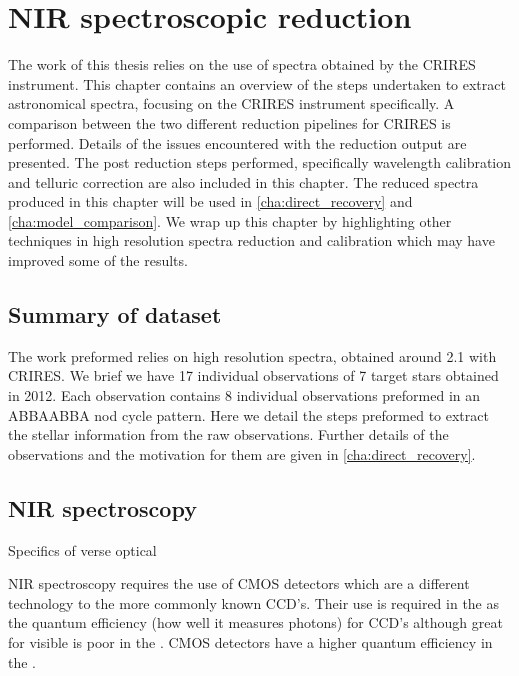 
\chapter{NIR spectroscopic reduction} %
\label{cha:reduction}
The work of this thesis relies on the use of \nir{} spectra obtained by the CRIRES instrument. This chapter contains an overview of the steps undertaken to extract astronomical spectra, focusing on the CRIRES instrument specifically. A comparison between the two different reduction pipelines for CRIRES is performed. Details of the issues encountered with the reduction output are presented. The post reduction steps performed, specifically wavelength calibration and telluric correction are also included in this chapter. The reduced spectra produced in this chapter will be used in \cref{cha:direct_recovery} and \cref{cha:model_comparison}. We wrap up this chapter by highlighting other techniques in high resolution \nir{} spectra reduction and calibration which may have improved some of the results.

\section{Summary of dataset}
\todo{}{}
The work preformed relies on high resolution \nir{} spectra, obtained around 2.1\um{} with CRIRES. We brief we have 17 individual observations of 7 target stars obtained in 2012. Each observation contains 8 individual observations preformed in an ABBAABBA nod cycle pattern. Here we detail the steps preformed to extract the stellar information from the raw observations. Further details of the observations and the motivation for them are given in \cref{cha:direct_recovery}.


\section{NIR spectroscopy}
\todo{}{}
Specifics of \nir{} verse optical

NIR spectroscopy requires the use of CMOS detectors which are a different technology to the more commonly known CCD's. Their use is required in the \nir{} as the quantum efficiency (how well it measures photons) for CCD's although great for visible is poor in the \nir. CMOS detectors have a higher quantum efficiency in the \nir.

